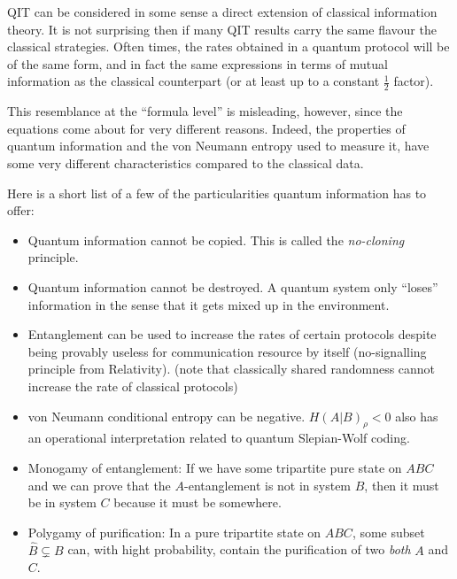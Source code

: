 \documentclass[aps,11pt,twoside,letterpaper]{article}
\begin{document}
	QIT can be considered in some sense a direct extension of classical information theory.
	It is not surprising then if many QIT results carry the same flavour the classical strategies.
	Often times, the rates obtained in a quantum protocol will be of the same form, and
	in fact the same expressions in terms of mutual information as 	the classical 
	counterpart (or at least up to a constant $\frac{1}{2}$ factor).
	
	This resemblance at the ``formula level'' is misleading, however, since the equations
	come about for very different reasons.
	Indeed, the properties of quantum information and the von Neumann entropy used
	to measure it, have some very different characteristics compared to the classical data.
	
	Here is a short list of a few of the particularities quantum information has to offer:
	
	\begin{itemize}
		\item 	Quantum information cannot be copied. This is called the \emph{no-cloning} principle.
		\item 	Quantum information cannot be destroyed. A quantum system only ``loses'' 
				information in the sense that it gets mixed up in the environment.
		\item 	Entanglement can be used to increase the rates of certain protocols despite being
				provably useless for communication resource by itself (no-signalling principle from Relativity).
				(note that classically shared randomness cannot increase the rate of classical protocols)
		\item 	von Neumann conditional entropy can be negative. 
				$H(A|B)_\rho < 0$ also has an operational interpretation related to quantum Slepian-Wolf coding.
		\item 	Monogamy of entanglement:  If we have some tripartite pure state on $ABC$ and we
				can prove that the $A$-entanglement is not in system $B$, then it must be in system $C$ 
				because it must be somewhere.
		\item		Polygamy of purification: In a pure tripartite state on $ABC$, some subset $\hat{B} \subsetneq B $ can,
				with hight probability, contain the purification of two \emph{both} $A$ and $C$.
	\end{itemize}	
\end{document}
